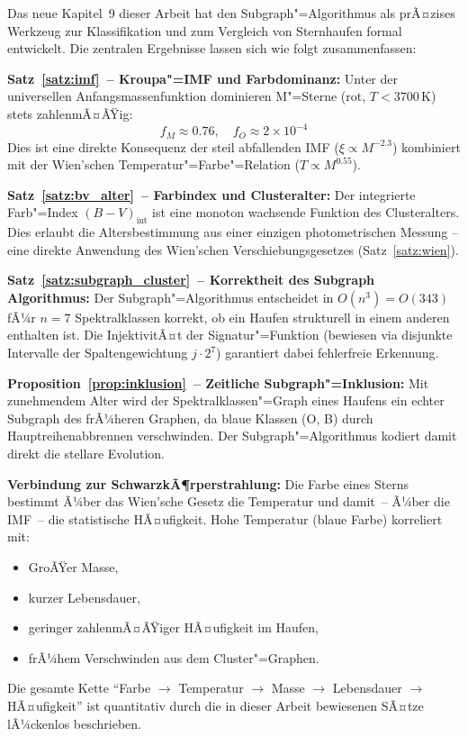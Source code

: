 ﻿\documentclass[a4paper,12pt]{article}
\theoremstyle{definition}
\begin{document}
Das neue Kapitel~9 dieser Arbeit hat den Subgraph"=Algorithmus als
prÃ¤zises Werkzeug zur Klassifikation und zum Vergleich von Sternhaufen
formal entwickelt. Die zentralen Ergebnisse lassen sich wie folgt
zusammenfassen:

\textbf{Satz~\ref{satz:imf}~-- Kroupa"=IMF und Farbdominanz:}
Unter der universellen Anfangsmassenfunktion dominieren M"=Sterne
(rot, $T < 3700\,\text{K}$) stets zahlenmÃ¤ÃŸig:
\[
    f_M \approx 0.76, \quad f_O \approx 2 \times 10^{-4}
\]
Dies ist eine direkte Konsequenz der steil abfallenden IMF
($\xi \propto M^{-2.3}$) kombiniert mit der Wien'schen
Temperatur"=Farbe"=Relation ($T \propto M^{0.55}$).

\textbf{Satz~\ref{satz:bv_alter}~-- Farbindex und Clusteralter:}
Der integrierte Farb"=Index $(B-V)_{\text{int}}$ ist eine monoton
wachsende Funktion des Clusteralters. Dies erlaubt die Altersbestimmung
aus einer einzigen photometrischen Messung -- eine direkte Anwendung
des Wien'schen Verschiebungsgesetzes (Satz~\ref{satz:wien}).

\textbf{Satz~\ref{satz:subgraph_cluster}~-- Korrektheit des Subgraph Algorithmus:}
Der Subgraph"=Algorithmus entscheidet in $O(n^3) = O(343)$ fÃ¼r $n = 7$
Spektralklassen korrekt, ob ein Haufen strukturell in einem anderen
enthalten ist. Die InjektivitÃ¤t der Signatur"=Funktion (bewiesen via
disjunkte Intervalle der Spaltengewichtung $j \cdot 2^7$) garantiert
dabei fehlerfreie Erkennung.

\textbf{Proposition~\ref{prop:inklusion}~-- Zeitliche Subgraph"=Inklusion:}
Mit zunehmendem Alter wird der Spektralklassen"=Graph eines Haufens
ein echter Subgraph des frÃ¼heren Graphen, da blaue Klassen (O, B)
durch Hauptreihenabbrennen verschwinden. Der Subgraph"=Algorithmus
kodiert damit direkt die stellare Evolution.

\textbf{Verbindung zur SchwarzkÃ¶rperstrahlung:}
Die Farbe eines Sterns bestimmt Ã¼ber das Wien'sche Gesetz die
Temperatur und damit~-- Ã¼ber die IMF~-- die statistische HÃ¤ufigkeit.
Hohe Temperatur (blaue Farbe) korreliert mit:
\begin{itemize}
    \item GroÃŸer Masse,
    \item kurzer Lebensdauer,
    \item geringer zahlenmÃ¤ÃŸiger HÃ¤ufigkeit im Haufen,
    \item frÃ¼hem Verschwinden aus dem Cluster"=Graphen.
\end{itemize}
Die gesamte Kette ``Farbe $\to$ Temperatur $\to$ Masse $\to$ Lebensdauer
$\to$ HÃ¤ufigkeit'' ist quantitativ durch die in dieser Arbeit bewiesenen
SÃ¤tze lÃ¼ckenlos beschrieben.
\end{document}
